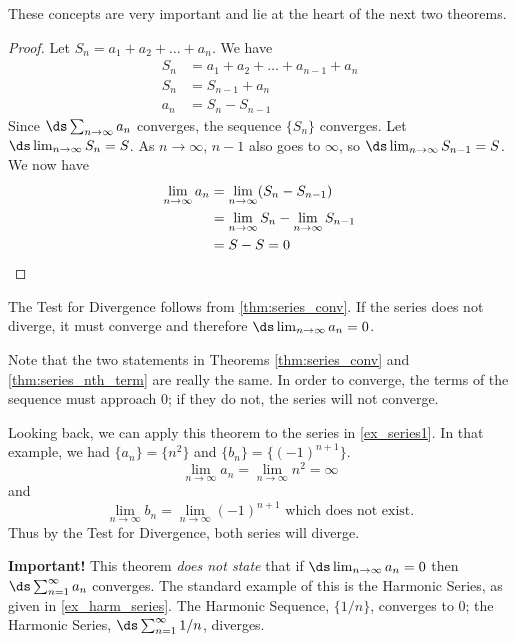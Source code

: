 These concepts are very important and lie at the heart of the next two theorems.


\begin{proof}
Let $S_n=a_1+a_2+\dots+a_n$. We have 
\begin{align*}
S_n&=a_1+a_2+\dots+a_{n-1}+a_n\\
S_n&=S_{n-1}+a_n\\
a_n&=S_n-S_{n-1}
\end{align*}
Since  $\ds \sum_{n\to\infty}a_n$ converges, the sequence $\{ S_n\}$ converges.  Let $\ds \lim_{n\to\infty} S_n=S$. As $n\to \infty$, $n-1$ also goes to $\infty$, so $\ds \lim_{n\to\infty} S_{n-1}=S$. We now have
\begin{align*}
\lim_{n\to\infty} a_n&= \lim_{n\to\infty}(S_n-S_{n-1})\\
&= \lim_{n\to\infty}S_n - \lim_{n\to\infty} S_{n-1}\\
&=S-S=0\qedhere
\end{align*}
\end{proof}


The Test for Divergence follows from \autoref{thm:series_conv}. If the series does not diverge, it must converge and therefore $\ds  \lim_{n\to\infty}a_n=0$.

Note that the two statements in Theorems \ref{thm:series_conv} and \ref{thm:series_nth_term} are really the same. In order to converge, the terms of the sequence must approach 0; if they do not, the series will not converge. 

Looking back, we can apply this theorem to the series in \autoref{ex_series1}. In that example, we had $\{a_n\} = \{n^2\}$ and $\{b_n\} = \{(-1)^{n+1}\}$.
\[\lim_{n\to\infty} a_n=\lim_{n\to\infty} n^2=\infty\]
and
\[\lim_{n\to\infty} b_n=\lim_{n\to\infty}(-1)^{n+1}\text{ which does not exist.}\]
Thus by the Test for Divergence, both series will diverge.

\textbf{Important!} This theorem \emph{does not state} that if $\ds \lim_{n\to\infty} a_n = 0$ then $\ds \sum_{n=1}^\infty  a_n $ converges. The standard example of this is the Harmonic Series, as given in \autoref{ex_harm_series}. The Harmonic Sequence, $\{1/n\}$, converges to 0; the Harmonic Series, $\ds \sum_{n=1}^\infty 1/n$, diverges.

